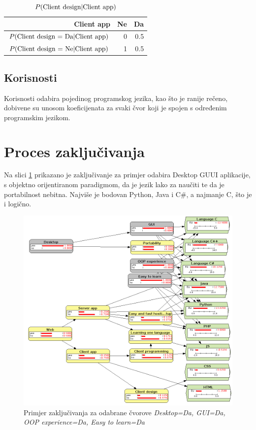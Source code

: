 \documentclass{article}
\begin{document}
	\begin{table}[h]
		\centering
		\begin{tabular}{ r || r | r }
			Client app	& Ne & Da \\ \hline
			$ P(\textnormal{Client design = Da} | \textnormal{Client app}) $ & 0 & 0.5 \\
			$ P(\textnormal{Client design = Ne} | \textnormal{Client app}) $ & 1 & 0.5 \\
			
		\end{tabular}
		\caption{$ P(\textnormal{Client design} | \textnormal{Client app}) $}
		\label{fig:client_design}
	\end{table}
	
	\subsection{Korisnosti}
	Korisnosti odabira pojedinog programskog jezika, kao što je ranije rečeno, dobivene su unosom koeficijenata za svaki čvor koji je spojen s određenim programskim jezikom.
	
	\section{Proces zaključivanja}
	
	Na slici \ref{fig:inference} prikazano je zaključivanje za primjer odabira Desktop GUUI aplikacije, s objektno orijentiranom paradigmom, da je jezik lako za naučiti te da je portabilnost nebitna. Najviše je bodovan Python, Java i C\#, a najmanje C, što je i logično.
	
	\begin{figure}
		\centering
		\includegraphics[width=0.9\linewidth]{img/inference}
		\caption[Primjer zaključivanja]{Primjer zaključivanja za odabrane čvorove \textit{Desktop=Da, GUI=Da, OOP experience=Da, Easy to learn=Da}}
		\label{fig:inference}
	\end{figure}
	
\end{document}
